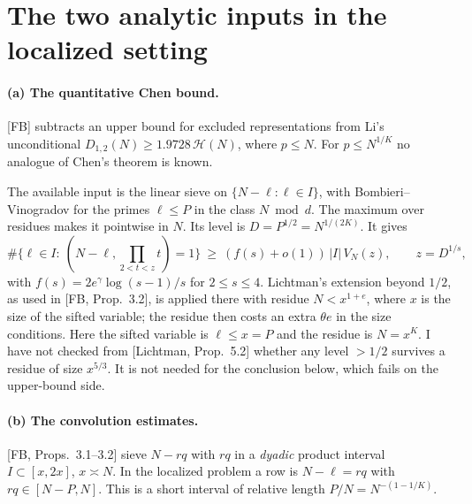 \documentclass[11pt,a4paper]{article}
\theoremstyle{remark}
\begin{document}
\section{The two analytic inputs in the localized setting}

\paragraph{(a) The quantitative Chen bound.}
[FB] subtracts an upper bound for excluded representations from Li's unconditional
$D_{1,2}(N)\ge 1.9728\,\mathcal H(N)$, where $p\le N$. For $p\le N^{1/K}$ no analogue of Chen's
theorem is known.

The available input is the linear sieve on $\{N-\ell:\ell\in I\}$, with Bombieri--Vinogradov for the
primes $\ell\le P$ in the class $N\bmod d$. The maximum over residues makes it pointwise in $N$.
Its level is $D=P^{1/2}=N^{1/(2K)}$. It gives
\[
\#\{\ell\in I:\ (N-\ell,\textstyle\prod_{2<t<z}t)=1\}\ \ge\ (f(s)+o(1))\,|I|\,V_N(z),
\qquad z=D^{1/s},
\]
with $f(s)=2e^\gamma\log(s-1)/s$ for $2\le s\le4$. Lichtman's extension beyond $1/2$, as used in
[FB, Prop.~3.2], is applied there with residue $N<x^{1+e}$, where $x$ is the size of the sifted
variable; the residue then costs an extra $\theta e$ in the size conditions. Here the sifted
variable is $\ell\le x=P$ and the residue is $N=x^{K}$. I have not checked from [Lichtman,
Prop.~5.2] whether any level $>1/2$ survives a residue of size $x^{5/3}$. It is not needed for the
conclusion below, which fails on the upper-bound side.

\paragraph{(b) The convolution estimates.}
[FB, Props.~3.1--3.2] sieve $N-rq$ with $rq$ in a \emph{dyadic} product interval $I\subset[x,2x]$,
$x\asymp N$. In the localized problem a row is $N-\ell=rq$ with $rq\in[N-P,N]$. This is a short
interval of relative length $P/N=N^{-(1-1/K)}$.
\end{document}
